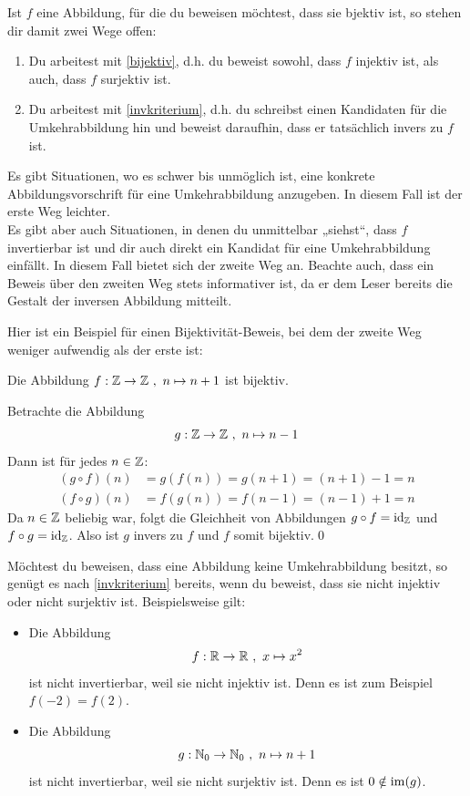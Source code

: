 \begin{bem}
 Ist $f$ eine Abbildung, für die du beweisen möchtest, dass sie bjektiv ist, so stehen dir damit zwei Wege offen:
 \begin{enumerate}
  \item Du arbeitest mit \cref{bijektiv}, d.h. du beweist sowohl, dass $f$ injektiv ist, als auch, dass $f$ surjektiv ist.
  \item Du arbeitest mit \cref{invkriterium}, d.h. du schreibst einen Kandidaten für die Umkehrabbildung hin und beweist daraufhin, dass er tatsächlich invers zu $f$ ist.
 \end{enumerate}
Es gibt Situationen, wo es schwer bis unmöglich ist, eine konkrete Abbildungsvorschrift für eine Umkehrabbildung anzugeben. In diesem Fall ist der erste Weg leichter. \\
Es gibt aber auch Situationen, in denen du unmittelbar „siehst“, dass $f$ invertierbar ist und dir auch direkt ein Kandidat für eine Umkehrabbildung einfällt. In diesem Fall bietet sich der zweite Weg an. Beachte auch, dass ein Beweis über den zweiten Weg stets informativer ist, da er dem Leser bereits die Gestalt der inversen Abbildung mitteilt.
\end{bem}



Hier ist ein Beispiel für einen Bijektivität-Beweis, bei dem der zweite Weg weniger aufwendig als der erste ist:
\begin{sat}
Die Abbildung $f:{\mathbb Z}\to {\mathbb Z} \ ,\ n\mapsto n+1$ ist bijektiv.
\end{sat}
\begin{bew}
Betrachte die Abbildung
\[ g:\Zz\to \Zz \ ,\ n \mapsto n-1 \]
Dann ist für jedes $n\in {\mathbb Z}$:
\begin{align*}
 (g\circ f)(n) & = g(f(n))=g(n+1)=(n+1)-1 = n \\
 (f\circ g)(n) & = f(g(n))=f(n-1)=(n-1)+1 = n 
\end{align*}
Da $n\in {\mathbb Z}$ beliebig war, folgt die Gleichheit von Abbildungen $g\circ f=\operatorname{id}_{\mathbb Z}$ und $f\circ g=\operatorname{id}_{\mathbb Z}$. Also ist $g$ invers zu $f$ und $f$ somit bijektiv.\qed
\end{bew}





\begin{bem} \label{invwiderleg}
 Möchtest du beweisen, dass eine Abbildung keine Umkehrabbildung besitzt, so genügt es nach \cref{invkriterium} bereits, wenn du beweist, dass sie nicht injektiv oder nicht surjektiv ist. Beispielsweise gilt:
 \begin{itemize}
  \item Die Abbildung
  \[ f : \Rz \to \Rz \ ,\ x\mapsto x^2\]
  ist nicht invertierbar, weil sie nicht injektiv ist. Denn es ist zum Beispiel $f(-2)=f(2)$.
  \item Die Abbildung
  \[ g : \Nz_0 \to \Nz_0 \ ,\ n \mapsto n+1 \]
  ist nicht invertierbar, weil sie nicht surjektiv ist. Denn es ist $0\notin \operatorname{im}(g)$.
 \end{itemize}
\end{bem}



